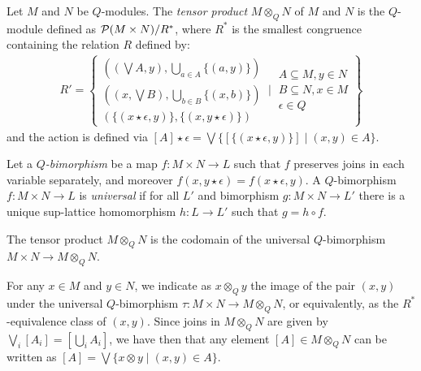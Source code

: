 \begin{definition}
Let $M$ and $N$ be $Q$-modules. The \emph{tensor product} $M\otimes_{Q}N$ of $M$ and $N$ is the $Q$-module defined as $\mathcal{P}(M\times N)/ R^{*}$, where $R^{*}$ is the smallest congruence containing the relation $R$ defined by:
\begin{align*}
R'= \left\{
\begin{matrix}
\left((\bigvee A, y), \bigcup_{a\in A}\{(a,y)\}\right)\\
\left((x,\bigvee B), \bigcup_{b\in B}\{(x,b)\}\right)\\
(\{(x\star \epsilon,y)\}, \{(x,y\star\epsilon)\})
\end{matrix}
\ \Bigg \vert\ 
\begin{matrix}
A\subseteq M, y\in N \\
B\subseteq N, x\in M \\
\epsilon \in Q
\end{matrix}
\right\}
\end{align*}
and the action is defined via $[A]\star \epsilon= \bigvee\{[ \{(x\star\epsilon,y)\}]\mid 
(x,y)\in A\}$.
\end{definition}



Let a \emph{$Q$-bimorphism} be a map $f:M\times N\to L$ such that $f$ preserves joins in each variable separately, and moreover $f(x,y\star \epsilon)=f(x\star\epsilon,y)$. A $Q$-bimorphism $f:M\times N\to L$ is \emph{universal} if for all $L'$ and bimorphism $g:M\times N\to L'$ there is a unique sup-lattice homomorphism $h:L\to L'$ such that $g=h\circ f$.

\begin{proposition}
The tensor product $M\otimes_{Q}N$ is the codomain of the universal $Q$-bimorphism $M\times N \to M\otimes_{Q}N$.
\end{proposition}


\begin{remark}

For any $x\in M$ and $y\in N$, we indicate as $x\otimes_{Q}y$ the image of the pair $(x,y)$ under the universal $Q$-bimorphism $\tau:M\times N\to M\otimes_{Q}N$, or equivalently, as the $R^{*}$-equivalence class of $(x,y)$.
Since joins in $M\otimes_{Q}N$ are given by  
$\bigvee_{i}[A_{i}]= [\bigcup_{i}A_{i}]$, we have then 
that any element $[A]\in M\otimes_{Q}N$ can be written as 
$[A]= \bigvee\{x\otimes y\mid (x,y)\in A\}$.

%
\end{remark}



